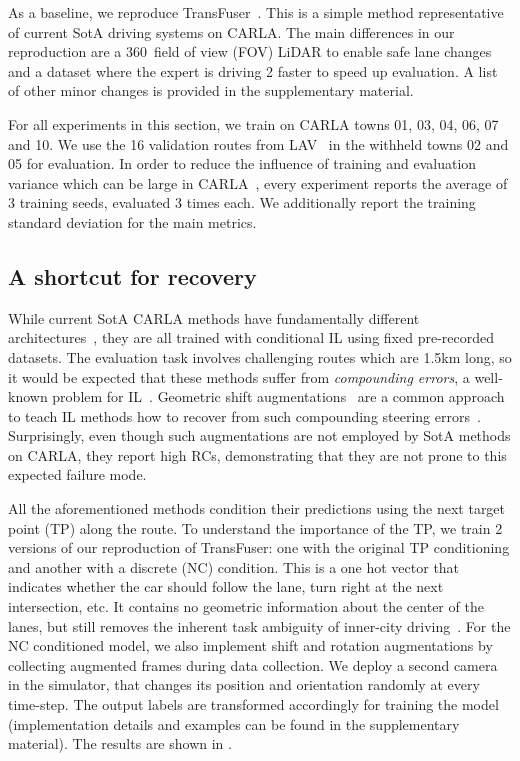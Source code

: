  As a baseline, we reproduce TransFuser~\cite{Chitta2022PAMI}. This is a simple method representative of current SotA driving systems on CARLA. The main differences in our reproduction are a 360\textdegree\ field of view (FOV) LiDAR to enable safe lane changes and a dataset where the expert is driving 2 faster to speed up evaluation. A list of other minor changes is provided in the supplementary material.

 For all experiments in this section, we train on CARLA towns 01, 03, 04, 06, 07 and 10. We use the 16 validation routes from LAV~\cite{Chen2022CVPRa} in the withheld towns 02 and 05 for evaluation. In order to reduce the influence of training and evaluation variance which can be large in CARLA~\cite{Behl2020IROS, Chitta2022PAMI}, every experiment reports the average of 3 training seeds, evaluated 3 times each. We additionally report the training standard deviation for the main metrics.

\subsection{A shortcut for recovery}
\label{sec:tp_shortcut}
While current SotA CARLA methods have fundamentally different architectures~\cite{Chitta2022PAMI, Shao2022CORL, Wu2022NeurIPS, Chen2022CVPRa}, they are all trained with conditional IL using fixed pre-recorded datasets. The evaluation task involves challenging routes which are 1.5km long, so it would be expected that these methods suffer from \textit{compounding errors}, a well-known problem for IL~\cite{Ross2011AISTATS}. Geometric shift augmentations~\cite{Bojarski2016ARXIV} are a common approach to teach IL methods how to recover from such compounding steering errors~\cite{Bojarski2016ARXIV,Codevilla2019ICCV}. Surprisingly, even though such augmentations are not employed by SotA methods on CARLA, they report high RCs, demonstrating that they are not prone to this expected failure mode.

All the aforementioned methods condition their predictions using the next target point (TP) along the route. To understand the importance of the TP, we train 2 versions of our reproduction of TransFuser: one with the original TP conditioning and another with a discrete (NC) condition. This is a one hot vector that indicates whether the car should follow the lane, turn right at the next intersection, etc. It contains no geometric information about the center of the lanes, but still removes the inherent task ambiguity of inner-city driving~\cite{Codevilla2018ICRA}. For the NC conditioned model, we also implement shift and rotation augmentations by collecting augmented frames during data collection. We deploy a second camera in the simulator, that changes its position and orientation randomly at every time-step. The output labels are transformed accordingly for training the model (implementation details and examples can be found in the supplementary material). The results are shown in . 


